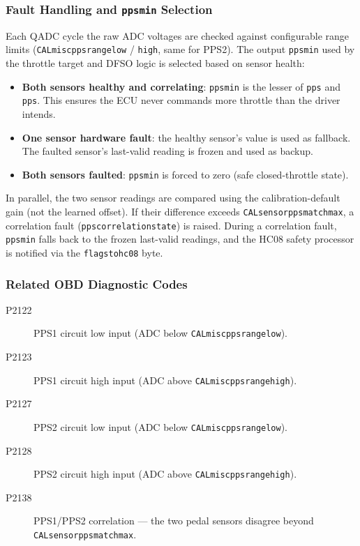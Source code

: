 \documentclass[a4paper,11pt]{article}
\renewcommand{\_}{\oldunderscore\allowbreak}
\begin{document}
\subsubsection*{Fault Handling and \texttt{pps\_min} Selection}

Each QADC cycle the raw ADC voltages are checked against configurable range
limits (\texttt{CAL\_misc\_pps\_1\_range\_low} /
\texttt{\_high}, same for PPS2). The output \texttt{pps\_min} used by the
throttle target and DFSO logic is selected based on sensor health:

\begin{itemize}
\item \textbf{Both sensors healthy and correlating}: \texttt{pps\_min} is the
      lesser of \texttt{pps\_1} and \texttt{pps\_2}. This ensures the ECU
      never commands more throttle than the driver intends.
\item \textbf{One sensor hardware fault}: the healthy sensor's value is used
      as fallback. The faulted sensor's last-valid reading is frozen and used
      as backup.
\item \textbf{Both sensors faulted}: \texttt{pps\_min} is forced to zero
      (safe closed-throttle state).
\end{itemize}

In parallel, the two sensor readings are compared using the calibration-default
gain (not the learned offset). If their difference exceeds
\texttt{CAL\_sensor\_pps\_match\_max}, a correlation fault
(\texttt{pps\_correlation\_state}) is raised. During a correlation fault,
\texttt{pps\_min} falls back to the frozen last-valid readings, and the
HC08 safety processor is notified via the \texttt{flags\_to\_hc08} byte.

\subsubsection*{Related OBD Diagnostic Codes}

\begin{description}
	\item[P2122] PPS1 circuit low input (ADC below \texttt{CAL\_misc\_pps\_1\_range\_low}).
	\item[P2123] PPS1 circuit high input (ADC above \texttt{CAL\_misc\_pps\_1\_range\_high}).
	\item[P2127] PPS2 circuit low input (ADC below \texttt{CAL\_misc\_pps\_2\_range\_low}).
	\item[P2128] PPS2 circuit high input (ADC above \texttt{CAL\_misc\_pps\_2\_range\_high}).
	\item[P2138] PPS1/PPS2 correlation --- the two pedal sensors disagree
	      beyond \texttt{CAL\_sensor\_pps\_match\_max}.
\end{description}
\end{document}
